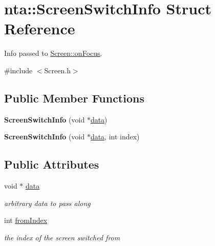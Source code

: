 \hypertarget{structnta_1_1ScreenSwitchInfo}{}\section{nta\+:\+:Screen\+Switch\+Info Struct Reference}
\label{structnta_1_1ScreenSwitchInfo}


Info passed to \hyperlink{classnta_1_1Screen_a895548cdf2a5170d671983fc9189579a}{Screen\+::on\+Focus}.  




{\ttfamily \#include $<$Screen.\+h$>$}

\subsection*{Public Member Functions}
\begin{DoxyCompactItemize}
\item 
\mbox{\label{structnta_1_1ScreenSwitchInfo_a8d35bf79c11197bd91325798f5e4ed1c}} 
{\bfseries Screen\+Switch\+Info} (void $\ast$\hyperlink{structnta_1_1ScreenSwitchInfo_aed1a9c21a062863f6777c0cf3a00f23e}{data})
\item 
\mbox{\label{structnta_1_1ScreenSwitchInfo_a6ad26e7cd2339ac667e1d1f909eacecb}} 
{\bfseries Screen\+Switch\+Info} (void $\ast$\hyperlink{structnta_1_1ScreenSwitchInfo_aed1a9c21a062863f6777c0cf3a00f23e}{data}, int index)
\end{DoxyCompactItemize}
\subsection*{Public Attributes}
\begin{DoxyCompactItemize}
\item 
\mbox{\label{structnta_1_1ScreenSwitchInfo_aed1a9c21a062863f6777c0cf3a00f23e}} 
void $\ast$ \hyperlink{structnta_1_1ScreenSwitchInfo_aed1a9c21a062863f6777c0cf3a00f23e}{data}
\begin{DoxyCompactList}\small\item\em arbitrary data to pass along \end{DoxyCompactList}\item 
\mbox{\label{structnta_1_1ScreenSwitchInfo_a92f6d94b44a2945cbb0a6f93a98c9b94}} 
int \hyperlink{structnta_1_1ScreenSwitchInfo_a92f6d94b44a2945cbb0a6f93a98c9b94}{from\+Index}
\begin{DoxyCompactList}\small\item\em the index of the screen switched from \end{DoxyCompactList}\end{DoxyCompactItemize}


